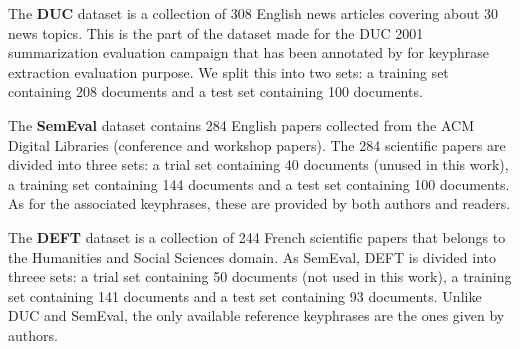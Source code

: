     The \textbf{DUC} dataset \cite{over2001duc} is a collection of 308 English
    news articles covering about 30 news topics. This is the part of the dataset
    made for the DUC 2001 summarization evaluation campaign that has been
    annotated by  for keyphrase extraction evaluation
    purpose. We split this into two sets: a training set containing 208
    documents and a test set containing 100 documents.

    The \textbf{SemEval} dataset \cite{kim2010semeval} contains 284 English
    papers collected from the ACM Digital Libraries (conference and workshop
    papers). The 284 scientific papers are divided into three sets: a trial set
    containing 40 documents (unused in this work), a training set containing 144
    documents and a test set containing 100 documents. As for the associated
    keyphrases, these are provided by both authors and readers.

    The \textbf{DEFT} dataset \cite{Paroubek2012deft} is a collection of 244
    French scientific papers that belongs to the Humanities and Social Sciences
    domain. As SemEval, DEFT is divided into threee sets: a trial set containing
    50 documents (not used in this work), a training set containing 141
    documents and a test set containing 93 documents. Unlike DUC and SemEval,
    the only available reference keyphrases are the ones given by authors.

